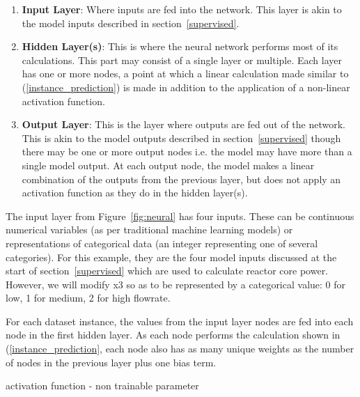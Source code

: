 \begin{enumerate}
	
	\item \textbf{Input Layer}: Where inputs are fed into the network. This layer is akin to the model inputs described in section~\ref{supervised}.
	
	\item \textbf{Hidden Layer(s)}: This is where the neural network performs most of its calculations. This part may consist of a single layer or multiple. Each layer has one or more nodes, a point at which a linear calculation made similar to (\ref{instance_prediction}) is made in addition to the application of a non-linear activation function.
	
	\item \textbf{Output Layer}: This is the layer where outputs are fed out of the network. This is akin to the model outputs described in section~\ref{supervised} though there may be one or more output nodes i.e. the model may have more than a single model output. At each output node, the model makes a linear combination of the outputs from the previous layer, but does not apply an activation function as they do in the hidden layer(s).
	
\end{enumerate}

\noindent
The input layer from Figure~\ref{fig:neural} has four inputs. These can be continuous numerical variables (as per traditional machine learning models) or representations of categorical data (an integer representing one of several categories).  For this example, they are the four model inputs discussed at the start of section~\ref{supervised} which are used to calculate reactor core power. However, we will modify x3 so as to be represented by a categorical value: 0 for low, 1 for medium, 2 for high flowrate. \

\noindent
For each dataset instance, the values from the input layer nodes are fed into each node in the first hidden layer. As each node performs the calculation shown in (\ref{instance_prediction}, each node also has as many unique weights as the number of nodes in the previous layer plus one bias term.

activation function - non trainable parameter

%
%
%
%

